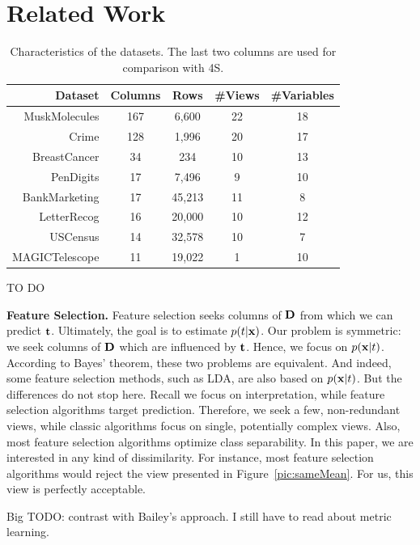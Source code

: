 \section{Related Work}
\label{sec:related-works}
\begin{table}[!t]
    \centering
    \small
    \begin{tabular}{r c c c c} 
        \hline
        Dataset & Columns & Rows & \#Views & \#Variables\\
        \hline
        MuskMolecules & 167 & 6,600 & 22 & 18\\
        Crime & 128 & 1,996 & 20 & 17\\
        BreastCancer & 34 & 234 & 10 & 13\\
        PenDigits & 17 & 7,496 & 9 & 10\\
        BankMarketing & 17 & 45,213 & 11& 8\\
        LetterRecog & 16 & 20,000 & 10 & 12\\
        USCensus & 14 & 32,578 & 10 & 7\\
        MAGICTelescope & 11 & 19,022 & 1 & 10\\
        \hline
    \end{tabular}
    \caption{Characteristics of the datasets. The last two columns are used for
    comparison with 4S.}
    \label{tab:datasets}
\end{table}

{\color{red} TO DO}

\textbf{Feature Selection.} Feature selection seeks columns of $\mathbf{D}$ from
which we can predict $\mathbf{t}$. Ultimately, the goal is to estimate
$p(t|\mathbf{x})$. Our problem is symmetric: we seek columns of $\mathbf{D}$ which are
influenced by $\mathbf{t}$. Hence, we focus on $p(\mathbf{x}|t)$. According to Bayes'
theorem, these two problems are equivalent. And indeed, some feature selection
methods, such as LDA, are also based on $p(\mathbf{x}|t)$. But the differences do
not stop here.  Recall we focus on interpretation, while feature selection
algorithms target prediction. Therefore, we seek a few, non-redundant views,
while classic algorithms focus on single, potentially complex views. Also, most
feature selection algorithms optimize class separability. In this paper, we are
interested in any kind of dissimilarity. For instance, most feature selection
algorithms would reject the view presented in Figure~\ref{pic:sameMean}. For
us, this view is perfectly acceptable. 

{\color{red} Big TODO: contrast with Bailey's approach.
I still have to read about metric learning.}


